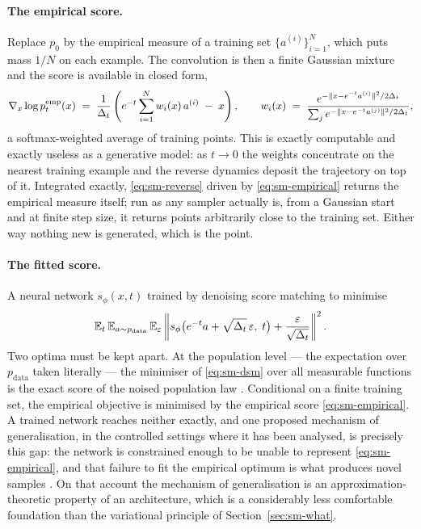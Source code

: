\paragraph{The empirical score.} Replace $p_0$ by the empirical measure of a
training set $\{a^{(i)}\}_{i=1}^{N}$, which puts mass $1/N$ on each example.
The convolution is then a finite Gaussian mixture and the score is available in
closed form,
\begin{equation}
  \nabla_x \log p^{\mathrm{emp}}_t(x)
  \;=\; \frac{1}{\Delta_t}\left(
  e^{-t} \sum_{i=1}^{N} w_i(x)\, a^{(i)} \;-\; x \right),
  \qquad
  w_i(x) \;=\; \frac{e^{-\lVert x - e^{-t} a^{(i)}\rVert^2 / 2\Delta_t}}
                    {\sum_{j} e^{-\lVert x - e^{-t} a^{(j)}\rVert^2 / 2\Delta_t}},
  \label{eq:sm-empirical}
\end{equation}
a softmax-weighted average of training points. This is exactly computable and
exactly useless as a generative model: as $t \to 0$ the weights concentrate on
the nearest training example and the reverse dynamics deposit the trajectory on
top of it. Integrated exactly, \eqref{eq:sm-reverse} driven by
\eqref{eq:sm-empirical} returns the empirical measure itself; run as any
sampler actually is, from a Gaussian start and at finite step size, it returns
points arbitrarily close to the training set. Either way nothing new is
generated, which is the point.


\paragraph{The fitted score.} A neural network $s_\phi(x,t)$ trained by
denoising score matching \citep{hyvarinen2005estimation, vincent2011connection}
to minimise
\begin{equation}
  \mathbb{E}_{t}\, \mathbb{E}_{a \sim p_{\mathrm{data}}}\, \mathbb{E}_{\varepsilon}
  \left\lVert
    s_\phi\big(e^{-t} a + \sqrt{\Delta_t}\,\varepsilon,\; t\big)
    + \frac{\varepsilon}{\sqrt{\Delta_t}}
  \right\rVert^{2}.
  \label{eq:sm-dsm}
\end{equation}
Two optima must be kept apart. At the population level --- the expectation
over $p_{\mathrm{data}}$ taken literally --- the minimiser of
\eqref{eq:sm-dsm} over all measurable functions is the exact score of the
noised population law \citep{vincent2011connection}. Conditional on a finite
training set, the empirical objective is minimised by the empirical score
\eqref{eq:sm-empirical}. A trained network reaches neither exactly, and one
proposed mechanism of generalisation, in the controlled settings where it has
been analysed, is precisely this gap: the network is constrained enough to be
unable to represent \eqref{eq:sm-empirical}, and that failure to fit the
empirical optimum is what produces novel samples
\citep{kadkhodaie2024generalization, kamb2024analytic}. On that account the
mechanism of generalisation is an approximation-theoretic property of an
architecture, which is a considerably less comfortable foundation than the
variational principle of Section~\ref{sec:sm-what}.

